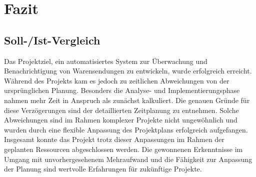 \section{Fazit}
\label{sec:Fazit}

\subsection{Soll-/Ist-Vergleich}
\label{sec:Soll-/Ist-Vergleich}
Das Projektziel, ein automatisiertes System zur Überwachung und Benachrichtigung von Warensendungen zu entwickeln, wurde erfolgreich erreicht.
Während des Projekts kam es jedoch zu zeitlichen Abweichungen von der ursprünglichen Planung. Besonders die Analyse- und Implementierungsphase nahmen mehr Zeit in Anspruch als zunächst kalkuliert. 
Die genauen Gründe für diese Verzögerungen sind der detaillierten Zeitplanung  zu entnehmen. Solche Abweichungen sind im Rahmen komplexer Projekte nicht ungewöhnlich und wurden durch eine flexible Anpassung 
des Projektplans erfolgreich aufgefangen. Insgesamt konnte das Projekt trotz dieser Anpassungen im Rahmen der geplanten Ressourcen abgeschlossen werden. 
Die gewonnenen Erkenntnisse im Umgang mit unvorhergesehenem Mehraufwand und die Fähigkeit zur Anpassung der Planung sind wertvolle Erfahrungen für zukünftige Projekte.

